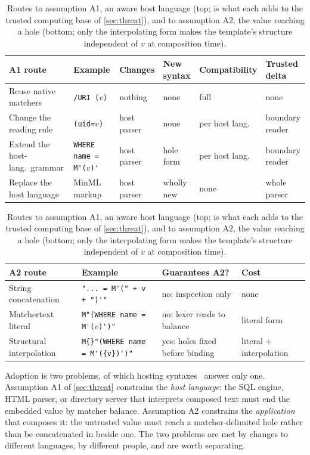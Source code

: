 \begin{table}[t]
\centering
\caption{Routes to assumption A1, an aware host language (top;  is what
each adds to the trusted computing base of \cref{sec:threat}), and to assumption
A2, the value reaching a hole (bottom; only the interpolating form makes the
template's structure independent of $v$ at composition time).}
\label{tab:resist:a1}
\label{tab:resist:a2}
\small
\begin{tabular}{llllll}
\hline
A1 route & Example & Changes & New syntax & Compatibility & Trusted delta \\
\hline
Reuse native matchers & \verb|/URI (|$v$\verb|)| & nothing & none & full & none \\
Change the reading rule & \verb|(uid=|$v$\verb|)| & host parser & none & per host lang.\ & boundary reader \\
Extend the host-lang.\ grammar & \verb|WHERE name = M'(|$v$\verb|)'| & host parser & hole form & per host lang.\ & boundary reader \\
Replace the host language & MinML~\cite{matchertext} markup & host parser & wholly new & none & whole parser \\
\hline
\end{tabular}
\vspace{0.6em}

\begin{tabular}{llll}
\hline
A2 route & Example & Guarantees A2? & Cost \\
\hline
String concatenation & \verb|"... = M'(" + v + ")'"| & no: inspection only & none \\
Matchertext literal & \verb|M"(WHERE name = M'(|$v$\verb|)')"| & no: lexer reads to balance & literal form \\
Structural interpolation & \verb|M{}"(WHERE name = M'({v})')"| & yes: holes fixed before binding & literal + interpolation \\
\hline
\end{tabular}
\end{table}

Adoption is two problems,
of which hosting syntaxes~\cite{matchertext} answer only one.
Assumption A1 of \cref{sec:threat} constrains the \emph{host language}: the SQL engine, HTML
parser, or directory server that interprets composed text must end the
embedded value by matcher balance.
Assumption A2 constrains the \emph{application} that composes it: the untrusted value
must reach a matcher-delimited hole rather than be concatenated in beside one.
The two problems are met by changes to different languages, by different people,
and are worth separating.

